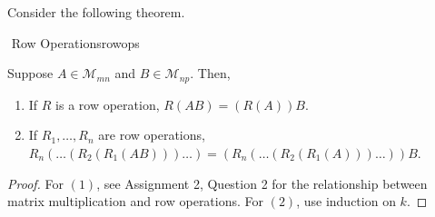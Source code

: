         \vphantom
        \\
        \\
        Consider the following theorem.
        \begin{theorem}{\Stop\,\,Row Operations}{rowops}
        
            Suppose \(A\in\mathcal{M}_{mn}\) and \(B\in\mathcal{M}_{np}\). Then,
            \begin{enumerate}
                \item If \(R\) is a row operation, \(R(AB)=(R(A))B\).
                \item If \(R_1,\ldots,R_n\) are row operations, \(R_n(
                \ldots(R_2(R_1(AB)))\ldots)=(R_n(\ldots(R_2(R_1(A)))\ldots))B\).
            \end{enumerate}
            \begin{proof}
                For \((1)\), see Assignment 2, Question 2 for the relationship between matrix multiplication and row operations. For \((2)\), use induction on \(k\).
            \end{proof}
            \DOTHISLATER
        \end{theorem}
        
